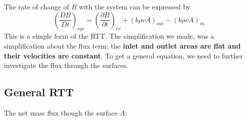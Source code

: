 The rate of change of $B$ with the system can be expressed by 
\begin{equation*}
	\boxed{\left(\frac{DB}{Dt}\right)_{sys} = \left(\frac{\partial B}{\partial t}\right)_{cv} + \left(b\rho v A\right)_{out}- \left(b\rho v A\right)_{in}}
\end{equation*}
This is a simple form of the RTT. The simplification we made, was a simplification about the flux term: the \textbf{inlet and outlet areas are flat and their velocities are constant}. To get a general equation, we need to further investigate the flux through the surfaces.

\subsection{General RTT}
The net mass flux though the surface $A$:

